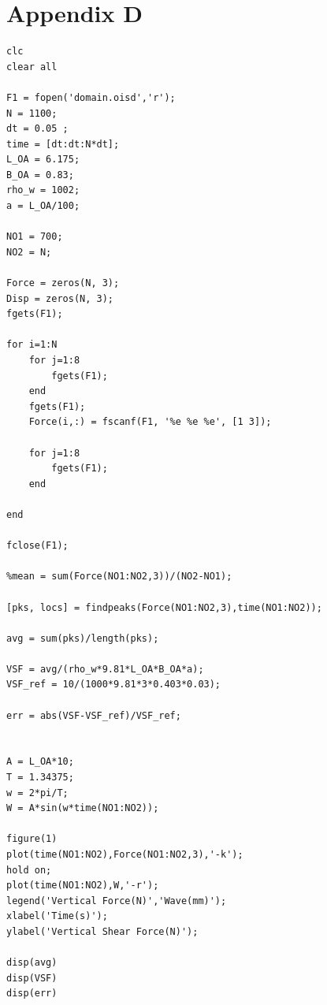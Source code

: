 \documentclass[12pt]{article} %
\begin{document}
\section*{Appendix D}
\begin{verbatim}
clc
clear all

F1 = fopen('domain.oisd','r');
N = 1100;
dt = 0.05 ;
time = [dt:dt:N*dt];
L_OA = 6.175;
B_OA = 0.83;
rho_w = 1002;
a = L_OA/100;

NO1 = 700;
NO2 = N;

Force = zeros(N, 3); 
Disp = zeros(N, 3); 
fgets(F1);

for i=1:N
    for j=1:8
        fgets(F1);
    end
    fgets(F1); 
    Force(i,:) = fscanf(F1, '%e %e %e', [1 3]);
    
    for j=1:8
        fgets(F1);
    end
    
end

fclose(F1);

%mean = sum(Force(NO1:NO2,3))/(NO2-NO1);

[pks, locs] = findpeaks(Force(NO1:NO2,3),time(NO1:NO2));

avg = sum(pks)/length(pks);

VSF = avg/(rho_w*9.81*L_OA*B_OA*a);
VSF_ref = 10/(1000*9.81*3*0.403*0.03);

err = abs(VSF-VSF_ref)/VSF_ref;


A = L_OA*10;
T = 1.34375;
w = 2*pi/T;
W = A*sin(w*time(NO1:NO2));

figure(1)
plot(time(NO1:NO2),Force(NO1:NO2,3),'-k');
hold on;
plot(time(NO1:NO2),W,'-r');
legend('Vertical Force(N)','Wave(mm)');
xlabel('Time(s)');
ylabel('Vertical Shear Force(N)');

disp(avg)
disp(VSF)
disp(err)

\end{verbatim}
\end{document}
